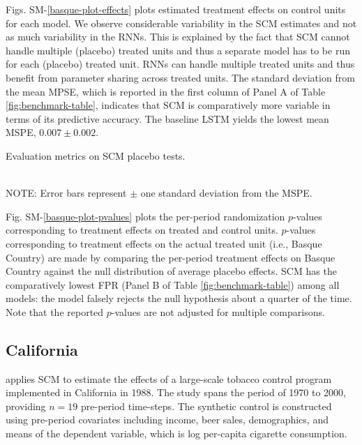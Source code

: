\documentclass[hidelinks,12pt]{article}
\begin{document}
Figs. SM-\ref{basque-plot-effects} plots estimated treatment effects on control units for each model. We observe considerable variability in the SCM estimates and not as much variability in the RNNs. This is explained by the fact that SCM cannot handle multiple (placebo) treated units and thus a separate model has to be run for each (placebo) treated unit. RNNs can handle multiple treated units and thus benefit from parameter sharing across treated units. The standard deviation from the mean MPSE, which is reported in the first column of Panel A of Table \ref{fig:benchmark-table}, indicates that SCM is comparatively more variable in terms of its predictive accuracy. The baseline LSTM yields the lowest mean MSPE, $0.007 \pm 0.002$. 

\begin{table}[htbp]
\begin{center}
\caption{Evaluation metrics on SCM placebo tests.\label{fig:benchmark-table}}
\resizebox{\width}{!}{}
\resizebox{\width}{!}{}\\
\footnotesize{{NOTE: Error bars represent $\pm$ one standard deviation from the MSPE.}}
\end{center}
\end{table}

Fig. SM-\ref{basque-plot-pvalues} plots the per-period randomization $p$-values corresponding to treatment effects on treated and control units. $p$-values corresponding to treatment effects on the actual treated unit (i.e., Basque Country) are made by comparing the per-period treatment effects on Basque Country against the null distribution of average placebo effects. SCM has the comparatively lowest FPR (Panel B of Table \ref{fig:benchmark-table}) among all models: the model falsely rejects the null hypothesis about a quarter of the time. Note that the reported $p$-values are not adjusted for multiple comparisons.

\subsection{California} 

\citet{abadie2010synthetic} applies SCM to estimate the effects of a large-scale tobacco control program implemented in California in 1988. The study spans the period of 1970 to 2000, providing $n=19$ pre-period time-steps.  The synthetic control is constructed using pre-period covariates including income, beer sales, demographics, and means of the dependent variable, which is log per-capita cigarette consumption. 
\end{document}
